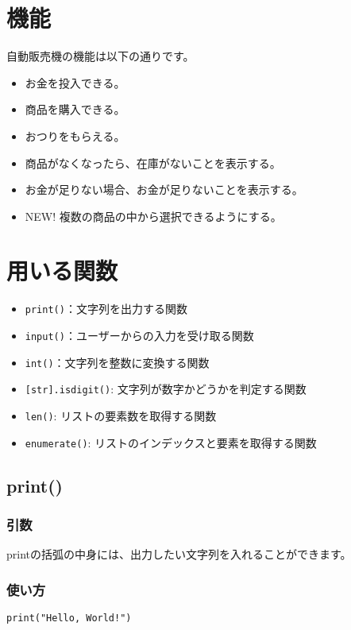 \documentclass[a4paper,titlepage,dvipdfmx]{jarticle}
\begin{document}
\section{機能}
自動販売機の機能は以下の通りです。
\begin{itemize}
  \item お金を投入できる。
  \item 商品を購入できる。
  \item おつりをもらえる。
  \item 商品がなくなったら、在庫がないことを表示する。
  \item お金が足りない場合、お金が足りないことを表示する。
  \item NEW! 複数の商品の中から選択できるようにする。
\end{itemize}

\section{用いる関数}
\begin{itemize}
  \item \texttt{print()}：文字列を出力する関数
  \item \texttt{input()}：ユーザーからの入力を受け取る関数
  \item \texttt{int()}：文字列を整数に変換する関数
  \item \texttt{[str].isdigit()}: 文字列が数字かどうかを判定する関数
  \item \texttt{len()}: リストの要素数を取得する関数
  \item \texttt{enumerate()}: リストのインデックスと要素を取得する関数
\end{itemize}

\subsection*{print()}
\subsubsection*{引数}
printの括弧の中身には、出力したい文字列を入れることができます。
\subsubsection*{使い方}
\begin{lstlisting}[caption=print()の使い方, label=print()]
  print("Hello, World!")
\end{lstlisting}
\end{document}
